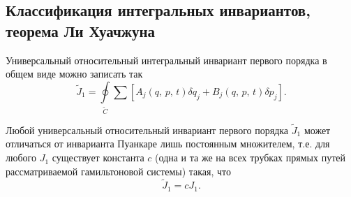 \documentclass[a4paper]{article}
\begin{document}
\subsection{Классификация интегральных инвариантов, теорема Ли Хуачжуна}
Универсальный относительный интегральный инвариант первого порядка в общем
виде можно записать так
\[
	\tilde{J}_1=\oint\limits_{\tilde{C}}\sum\left[ A_j(q,\,p,\,t)\delta q_j
	+B_j(q,\,p,\,t)\delta p_j\right] 
.\] 
\begin{thm}
	Любой универсальный относительный инвариант первого порядка $\tilde{J}_1$
	может отличаться от инварианта Пуанкаре лишь постоянным множителем,
	 т.\:е. для любого $J_1$ существует константа $c$
	 (одна и та же на всех трубках прямых путей рассматриваемой
	 гамильтоновой системы) такая, что
	 \[
		 \tilde{J}_1=cJ_1
	 .\] 
\end{thm}
\end{document}
